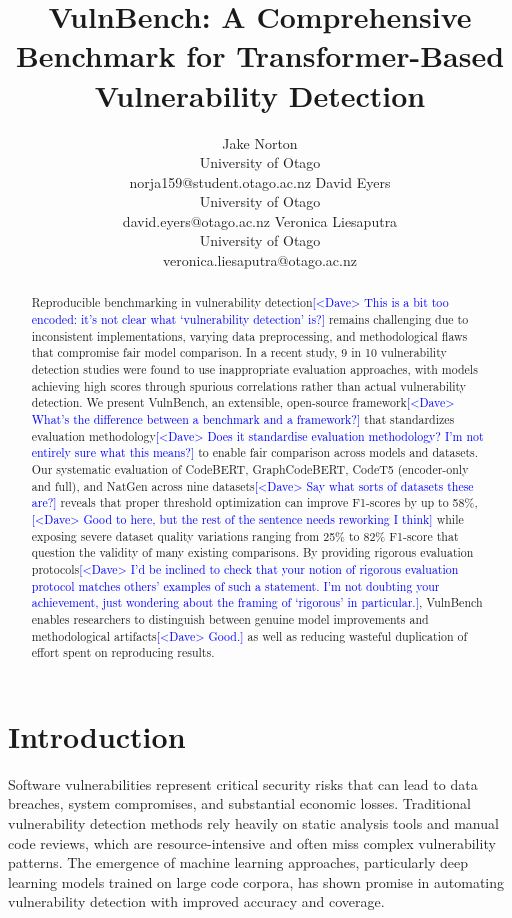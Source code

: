 \documentclass[letterpaper]{article}
\title{VulnBench: A Comprehensive Benchmark for Transformer-Based Vulnerability Detection}
\author{
Jake Norton\\
University of Otago\\
norja159@student.otago.ac.nz
\And
David Eyers\\
University of Otago\\
david.eyers@otago.ac.nz
\And
Veronica Liesaputra\\
University of Otago\\
veronica.liesaputra@otago.ac.nz
}
\newcommand{\note}[2][red]{\textcolor{#1}{#2}}
\newcommand{\notedme}[1]{\note[blue]{[<Dave> #1]}}
\begin{document}
\maketitle

\begin{abstract}
	Reproducible benchmarking in vulnerability detection\notedme{This is a bit too encoded: it's not clear what `vulnerability detection' is?} remains challenging due to inconsistent implementations, varying data preprocessing, and methodological flaws that compromise fair model comparison. In a recent study, 9 in 10 vulnerability detection studies were found to use inappropriate evaluation approaches, with models achieving high scores through spurious correlations rather than actual vulnerability detection. We present VulnBench, an extensible, open-source framework\notedme{What's the difference between a benchmark and a framework?} that standardizes evaluation methodology\notedme{Does it standardise evaluation methodology? I'm not entirely sure what this means?} to enable fair comparison across models and datasets. Our systematic evaluation of CodeBERT, GraphCodeBERT, CodeT5 (encoder-only and full), and NatGen across nine datasets\notedme{Say what sorts of datasets these are?} reveals that proper threshold optimization can improve F1-scores by up to 58\%, \notedme{Good to here, but the rest of the sentence needs reworking I think} while exposing severe dataset quality variations ranging from 25\% to 82\% F1-score that question the validity of many existing comparisons. By providing rigorous evaluation protocols\notedme{I'd be inclined to check that your notion of rigorous evaluation protocol matches others' examples of such a statement. I'm not doubting your achievement, just wondering about the framing of `rigorous' in particular.}, VulnBench enables researchers to distinguish between genuine model improvements and methodological artifacts\notedme{Good.} as well as reducing wasteful duplication of effort spent on reproducing results.
\end{abstract}


\section{Introduction}

Software vulnerabilities represent critical security risks that can lead to data breaches, system compromises, and substantial economic losses. Traditional vulnerability detection methods rely heavily on static analysis tools and manual code reviews, which are resource-intensive and often miss complex vulnerability patterns. The emergence of machine learning approaches, particularly deep learning models trained on large code corpora, has shown promise in automating vulnerability detection with improved accuracy and coverage.
\end{document}
